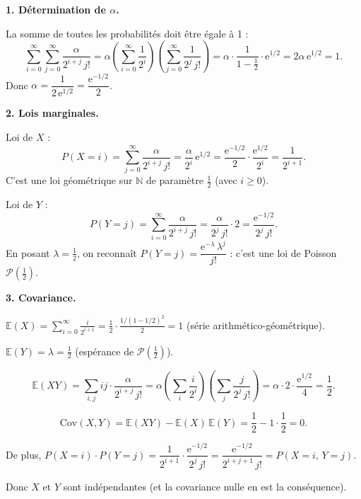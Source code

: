 \documentclass[12pt,a4paper]{article}
\begin{document}
\begin{boitecorrige}
\textbf{1. Détermination de $\alpha$.}

La somme de toutes les probabilités doit être égale à 1 :
\[
\sum_{i=0}^{\infty}\sum_{j=0}^{\infty} \frac{\alpha}{2^{i+j}\,j!}
= \alpha \left(\sum_{i=0}^{\infty} \frac{1}{2^i}\right)\left(\sum_{j=0}^{\infty} \frac{1}{2^j\,j!}\right)
= \alpha \cdot \frac{1}{1-\tfrac{1}{2}} \cdot \mathrm{e}^{1/2}
= 2\alpha\,\mathrm{e}^{1/2} = 1.
\]
Donc $\alpha = \dfrac{1}{2\,\mathrm{e}^{1/2}} = \dfrac{\mathrm{e}^{-1/2}}{2}$.

\textbf{2. Lois marginales.}

Loi de $X$ :
\[
P(X=i) = \sum_{j=0}^{\infty} \frac{\alpha}{2^{i+j}\,j!}
= \frac{\alpha}{2^i}\,\mathrm{e}^{1/2} = \frac{\mathrm{e}^{-1/2}}{2} \cdot \frac{\mathrm{e}^{1/2}}{2^i} = \frac{1}{2^{i+1}}.
\]
C'est une loi géométrique sur $\mathbb{N}$ de paramètre $\tfrac{1}{2}$ (avec $i \geq 0$).

Loi de $Y$ :
\[
P(Y=j) = \sum_{i=0}^{\infty} \frac{\alpha}{2^{i+j}\,j!}
= \frac{\alpha}{2^j\,j!} \cdot 2 = \frac{\mathrm{e}^{-1/2}}{2^j\,j!}.
\]
En posant $\lambda = \tfrac{1}{2}$, on reconnaît $P(Y=j) = \dfrac{\mathrm{e}^{-\lambda}\,\lambda^j}{j!}$ : c'est une loi de Poisson $\mathcal{P}\!\left(\tfrac{1}{2}\right)$.

\textbf{3. Covariance.}

$\mathbb{E}(X) = \displaystyle\sum_{i=0}^{\infty} \frac{i}{2^{i+1}} = \frac{1}{2}\cdot\frac{1/(1-1/2)^2}{2} = 1$ (série arithmético-géométrique).

$\mathbb{E}(Y) = \lambda = \tfrac{1}{2}$ (espérance de $\mathcal{P}(\tfrac{1}{2})$).

\[
\mathbb{E}(XY) = \sum_{i,j} ij \cdot \frac{\alpha}{2^{i+j}\,j!}
= \alpha \left(\sum_i \frac{i}{2^i}\right)\!\left(\sum_j \frac{j}{2^j\,j!}\right)
= \alpha \cdot 2 \cdot \frac{\mathrm{e}^{1/2}}{4} = \frac{1}{2}.
\]

\[
\mathrm{Cov}(X,Y) = \mathbb{E}(XY) - \mathbb{E}(X)\,\mathbb{E}(Y) = \frac{1}{2} - 1 \cdot \frac{1}{2} = 0.
\]

De plus, $P(X=i)\cdot P(Y=j) = \dfrac{1}{2^{i+1}} \cdot \dfrac{\mathrm{e}^{-1/2}}{2^j\,j!} = \dfrac{\mathrm{e}^{-1/2}}{2^{i+j+1}\,j!} = P(X=i,\,Y=j)$.

Donc $X$ et $Y$ sont indépendantes (et la covariance nulle en est la conséquence).
\end{boitecorrige}
\end{document}
